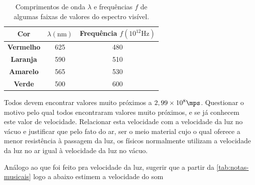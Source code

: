     \begin{table}[!ht]
        \centering
        \begin{tabular}{|c|c|c|}
        \hline
        \textbf{Cor}      & \textbf{$\lambda(\textrm{nm})$} & \textbf{Frequência $f(10^{12}\textrm{Hz})$} \\ \hline
        \textbf{Vermelho} & 625                             & 480                                         \\ \hline
        \textbf{Laranja}  & 590                             & 510                                         \\ \hline
        \textbf{Amarelo}  & 565                             & 530                                         \\ \hline
        \textbf{Verde}    & 500                             & 600                                         \\ \hline
        \end{tabular}
        \caption{Comprimentos de onda $\lambda$ e frequências $f$ de algumas faixas de valores do espectro visível.}
        \label{tab:alguns-espectros-do-visivel}
    \end{table}
    \vspace*{10pt}

    \noindent Todos devem encontrar valores muito próximos a $2,99\times 10^8\mps$. Questionar o motivo pelo qual todos encontraram valores muito próximos, e se já conhecem este valor de velocidade. Relacionar esta velocidade com a velocidade da luz no vácuo e justificar que pelo fato do ar, ser o meio material cujo o qual oferece a menor resistência à passagem da luz, os físicos normalmente utilizam a velocidade da luz no ar igual à velocidade da luz no vácuo.
    
    Análogo ao que foi feito pra velocidade da luz, sugerir que a partir da \autoref{tab:notas-musicais} logo a abaixo estimem a velocidade do som
    \vspace*{10pt}
    
